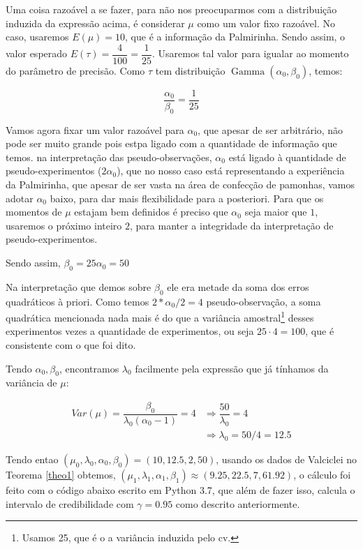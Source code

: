 \documentclass[a4paper]{article}
\newcommand{\op}[1]{{\operatorname{#1}}}
\begin{document}
Uma coisa razoável a se fazer, para não nos preocuparmos com a distribuição induzida da expressão acima, é considerar $\mu$ como um valor fixo razoável. No caso, usaremos $E(\mu)=10$, que é a informação da Palmirinha. Sendo assim, o valor esperado $E(\tau)=\dfrac{4}{100}=\dfrac{1}{25}$. Usaremos tal valor para igualar ao momento do parâmetro de precisão. Como $\tau$ tem distribuição $\op{Gamma}(\alpha_0,\beta_0)$, temos:

\[\dfrac{\alpha_0}{\beta_0}=\dfrac{1}{25}\]

Vamos agora fixar um valor razoável para $\alpha_0$, que apesar de ser arbitrário, não pode ser muito grande pois estpa ligado com a quantidade de informação que temos. na interpretação das pseudo-observações, $\alpha_0$ está ligado à quantidade de pseudo-experimentos ($2\alpha_0$), que no nosso caso está representando a experiência da Palmirinha, que apesar de ser vasta na área de confecção de pamonhas, vamos adotar $\alpha_0$ baixo, para dar mais flexibilidade para a posteriori. Para que os momentos de $\mu$ estajam bem definidos é preciso que $\alpha_0$ seja maior que $1$, usaremos o próximo inteiro $2$, para manter a integridade da interpretação de pseudo-experimentos.

Sendo assim, $\beta_0=25\alpha_0=50$

Na interpretação que demos sobre $\beta_0$ ele era metade da soma dos erros quadráticos à priori. Como temos $2*\alpha_0/2=4$ pseudo-observação, a soma quadrática mencionada nada mais é do que a variância amostral\footnote{Usamos 25, que é o a variância induzida pelo cv.} desses experimentos vezes a quantidade de experimentos, ou seja $25\cdot 4=100$, que é consistente com o que foi dito.

Tendo $\alpha_0,\beta_0$, encontramos $\lambda_0$ facilmente pela expressão que já tínhamos da variância de $\mu$:

\begin{align*}
	Var(\mu)=\dfrac{\beta_0}{\lambda_0(\alpha_0-1)}=4&\Rightarrow\dfrac{50}{\lambda_0}=4\\
	&\Rightarrow\lambda_0=50/4=12.5
\end{align*}

Tendo entao $(\mu_0,\lambda_0,\alpha_0,\beta_0)=(10,12.5,2,50)$, usando os dados de Valciclei no Teorema \ref{theo1} obtemos, $(\mu_1,\lambda_1,\alpha_1,\beta_1)\approx(9.25,22.5,7,61.92)$, o cálculo foi feito com o código abaixo escrito em Python 3.7, que além de fazer isso, calcula o intervalo de credibilidade com $\gamma=0.95$ como descrito anteriormente.
\end{document}
